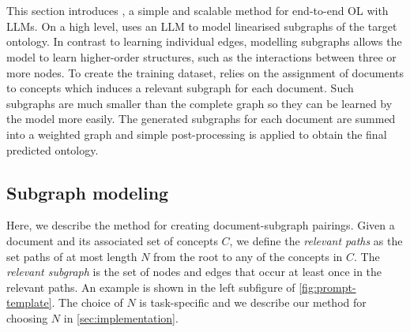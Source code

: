 \section{\name}  \label{sec:implementation:core}

This section introduces \name, a simple and scalable method for end-to-end OL with LLMs. On a high level, \name uses an LLM to model linearised subgraphs of the target ontology. In contrast to learning individual edges, modelling subgraphs allows the model to learn higher-order structures, such as the interactions between three or more nodes. To create the training dataset, \name relies on the assignment of documents to concepts which induces a relevant subgraph for each document. Such subgraphs are much smaller than the complete graph so they can be learned by the model more easily. The generated subgraphs for each document are summed into a weighted graph and simple post-processing is applied to obtain the final predicted ontology.


\subsection{Subgraph modeling}  \label{sec:method:subgraph}



Here, we describe the method for creating document-subgraph pairings. Given a document and its associated set of concepts $C$, we define the \emph{relevant paths} as the set paths of at most length $N$ from the root to any of the concepts in $C$. The \emph{relevant subgraph} is the set of nodes and edges that occur at least once in the relevant paths. An example is shown in the left subfigure of \cref{fig:prompt-template}. The choice of $N$ is task-specific and we describe our method for choosing $N$ in \cref{sec:implementation}.

